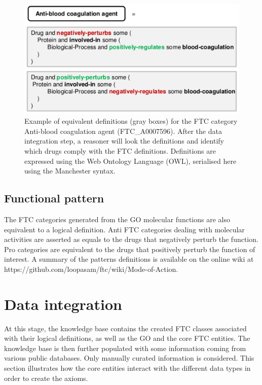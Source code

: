 \documentclass{bioinfo}
\begin{document}
\begin{figure}[!tpb]%
\centerline{\includegraphics{figS1.png}}
\caption{Example of equivalent definitions (gray boxes) for the FTC category Anti-blood coagulation 
agent (FTC\_A0007596). After the data integration step, a reasoner will look the definitions and identify 
which drugs comply with the FTC definitions. Definitions are expressed using the Web Ontology Language (OWL), 
serialised here using the Manchester syntax.}\label{fig:S01}
\end{figure}

\subsection{Functional pattern}
The FTC categories generated from the GO molecular functions are also equivalent to a logical 
definition. Anti FTC categories dealing with molecular activities are asserted as equals to the drugs 
that negatively perturb the function. Pro categories are equivalent to the drugs that positively perturb the 
function of interest. A summary of the patterns definitions is available on the 
online wiki at {{https://github.com/loopasam/ftc/wiki/Mode-of-Action}}.

\section{Data integration}
At this stage, the knowledge base contains the created FTC classes associated with their 
logical definitions, as well as the GO and the core FTC entities. The knowledge base is then 
further populated with some information coming from various public databases. Only manually curated 
information is considered. This section illustrates how the core entities interact with the different data types 
in order to create the axioms.
\end{document}
